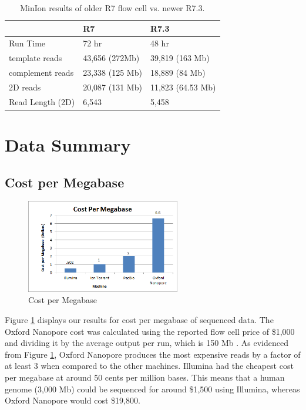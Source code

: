\documentclass[12pt,letterpaper]{report}
\begin{document}
\begin{table}[htb]
\begin{center}
\begin{tabular}{lll}
\hline
 & R7 & R7.3 \\
\hline
Run Time & 72 hr & 48 hr \\
template reads & 43,656 (272Mb) & 39,819 (163 Mb) \\
complement reads & 23,338 (125 Mb) & 18,889 (84 Mb) \\
2D reads & 20,087 (131 Mb) & 11,823 (64.53 Mb) \\
Read Length (2D) & 6,543 & 5,458 \\
\hline
\end{tabular}
\caption{MinIon results of older R7 flow cell vs. newer R7.3.}
\label{table:summary_nanopore}
\end{center}
\end{table}

\section{Data Summary}

\subsection{Cost per Megabase}

\begin{figure}
\vspace{-20pt}
  \begin{center}
    \includegraphics[width=0.6\textwidth]{cost_per_megabase.png}
  \end{center}
  \vspace{-20pt}
  \caption[Cost per Megabase]{Cost per Megabase \protect\cite{Quick}}
  \vspace{-10pt}
  \label{fig:cost_per_megabase}
\end{figure}

Figure \ref{fig:cost_per_megabase} displays our results for cost per megabase of sequenced data. The Oxford Nanopore cost was calculated using the reported flow cell price of \$1,000 and dividing it by the average output per run, which is 150 Mb \cite{Quick}. As evidenced from Figure \ref{fig:cost_per_megabase}, Oxford Nanopore produces the most expensive reads by a factor of at least 3 when compared to the other machines. Illumina had the cheapest cost per megabase at around 50 cents per million bases. This means that a human genome (3,000 Mb) could be sequenced for around \$1,500 using Illumina, whereas Oxford Nanopore would cost \$19,800.
\end{document}
